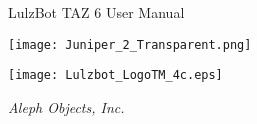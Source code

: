 %
%
%
%
%

\date {}
\thispagestyle{empty}
\begingroup
\centering 

\begin{center}
\fontsize{24pt}{1em}\selectfont LulzBot TAZ 6 User Manual

\end{center}

\par


\texttt{[image: Juniper\_2\_Transparent.png]}

\begin{center}
\texttt{[image: Lulzbot\_LogoTM\_4c.eps]}

{\large \itshape Aleph Objects, Inc.}
\end{center}
\endgroup
